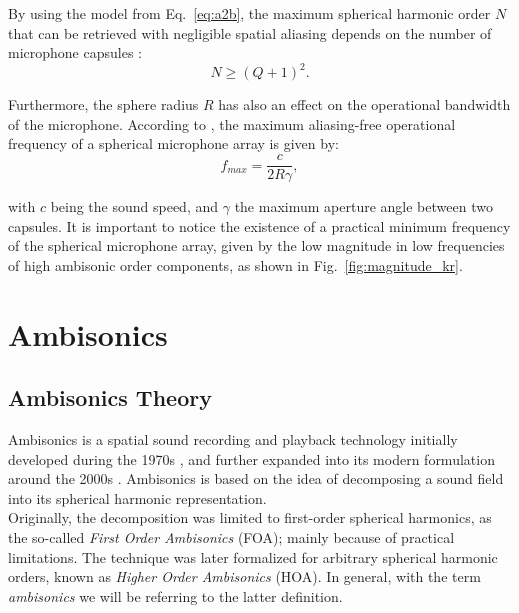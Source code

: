 %

\newpage
By using the model from Eq.~\ref{eq:a2b}, the maximum spherical harmonic order $N$ that can be retrieved with negligible spatial aliasing depends on the number of microphone capsules \cite{moreau20063d}:
\begin{equation}
	N \geq (Q + 1)^2.
\end{equation}

\newpage
Furthermore, the sphere radius $R$ has also an effect on the operational bandwidth of the microphone. According to \cite{moreau20063d}, the maximum aliasing-free operational frequency of a spherical microphone array is given by:
\begin{equation}
	f_{max} = \frac{c} {2 R \gamma},
	\label{eq:falias}
\end{equation}

with $c$ being the sound speed, and $\gamma$ the maximum aperture angle between two capsules. 
It is important to notice the existence of a practical minimum frequency of the spherical microphone array, given by the low magnitude in low frequencies of high ambisonic order components, as shown in Fig.~\ref{fig:magnitude_kr}. 



\section{Ambisonics}
\label{sec:ambisonics}

\subsection{Ambisonics Theory}

Ambisonics is a spatial sound recording and playback technology initially developed during the 1970s \cite{gerzon1973periphony}, and further expanded into its modern formulation around the 2000s \cite{daniel2000representation}.  
Ambisonics is based on the idea of decomposing a sound field into its spherical harmonic representation. \\

Originally, the decomposition was limited to first-order spherical harmonics, as the so-called \textit{First Order Ambisonics} (FOA); mainly because of practical limitations. 
The technique was later formalized for arbitrary spherical harmonic orders, known as \textit{Higher Order Ambisonics} (HOA).
In general, with the term \textit{ambisonics} we will be referring to the latter definition.\\

